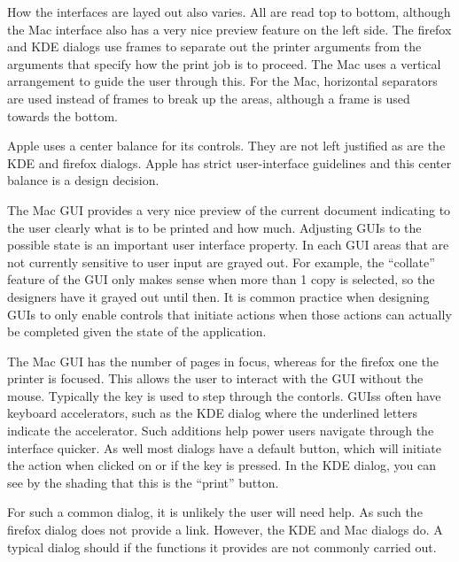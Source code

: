 How the interfaces are layed out also varies. All are read top to
bottom, although the Mac interface also has a very nice preview
feature on the left side. The firefox and KDE dialogs use frames to
separate out the printer arguments from the arguments that specify how
the print job is to proceed. The Mac uses a vertical arrangement to
guide the user through this. For the Mac, horizontal separators are used instead of
frames to break up the areas, although a frame is used towards the
bottom. 

Apple uses a center balance for its controls. They are not left
justified as are the KDE and firefox dialogs. Apple has strict
user-interface guidelines and this center balance is a design
decision. 




The Mac GUI provides a very nice preview of the current document
indicating to the user clearly what is to be printed and how
much. Adjusting GUIs to the possible state is an important user
interface property.
In each  GUI areas that are not currently sensitive to
user input are grayed out. For example, the ``collate'' feature of the GUI only makes
sense when more than 1 copy is selected, so the designers have it
grayed out until then. It is common practice when designing GUIs to
only enable controls that initiate actions when those actions can
actually be completed given the state of the application. 

 
The Mac GUI has the number of pages in focus, whereas for the firefox
one the printer is focused. This allows the user to interact with the
GUI without the mouse. Typically the  key is used to step
through the contorls. GUIss often have keyboard accelerators, such as
the KDE dialog where the underlined letters indicate the
accelerator. Such additions help power users navigate through the
interface quicker. As well most dialogs have a default button, which
will initiate the action when clicked on or if the  key is
pressed. In the KDE dialog, you can see by the shading that this is
the ``print'' button.

For such a common dialog, it is unlikely the user will need help. As
such the firefox  dialog does not provide a link. However, the
KDE and Mac dialogs do. A typical dialog should if the functions it provides
are not commonly carried out.

